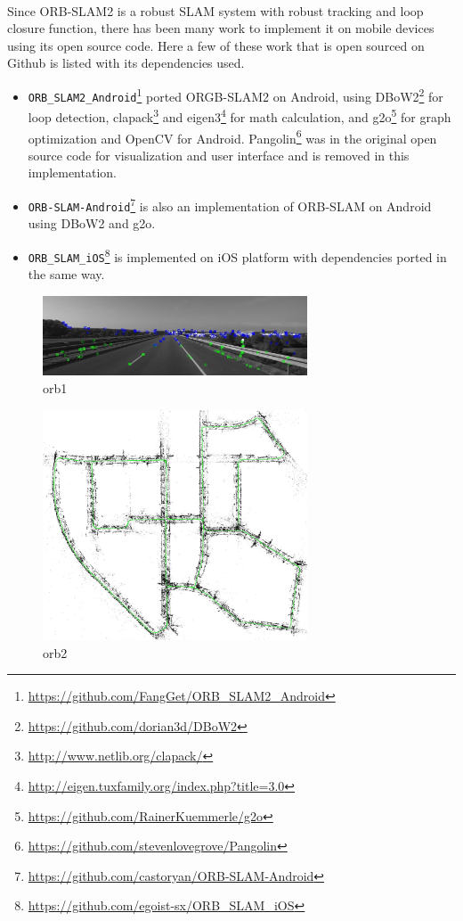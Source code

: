 \documentclass[12pt,twoside]{article}
\begin{document}
\\
Since ORB-SLAM2 is a robust SLAM system with robust tracking and loop closure function, there has been many work to implement it on mobile devices using its open source code. Here a few of these work that is open sourced on Github is listed with its dependencies used.
\begin{itemize}
   \item \verb|ORB_SLAM2_Android|\footnote{\url{https://github.com/FangGet/ORB_SLAM2_Android}} ported ORGB-SLAM2 on Android, using DBoW2\footnote{\url{https://github.com/dorian3d/DBoW2}} for loop detection, clapack\footnote{\url{http://www.netlib.org/clapack/}} and eigen3\footnote{\url{http://eigen.tuxfamily.org/index.php?title=3.0}} for math calculation, and g2o\footnote{\url{https://github.com/RainerKuemmerle/g2o}} for graph optimization and OpenCV for Android. Pangolin\footnote{\url{https://github.com/stevenlovegrove/Pangolin}} was in the original open source code for visualization and user interface and is removed in this implementation.
   \item \verb|ORB-SLAM-Android|\footnote{\url{https://github.com/castoryan/ORB-SLAM-Android}} is also an implementation of ORB-SLAM on Android using DBoW2 and g2o.
   \item \verb|ORB_SLAM_iOS|\footnote{\url{https://github.com/egoist-sx/ORB_SLAM_iOS}} is implemented on iOS platform with dependencies ported in the same way.
  \end{itemize}
\begin{figure}[h]
    \centering
    \includegraphics[width=0.7\textwidth]{figures/orb1}
    \caption{orb1}
    \label{fig: orb1}
\end{figure}

\begin{figure}[h]
    \centering
    \includegraphics[width=0.7\textwidth]{figures/orb2}
    \caption{orb2}
    \label{fig: orb2}
\end{figure}
\end{document}
